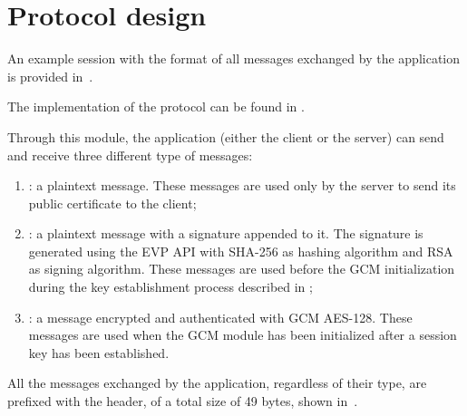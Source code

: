 \chapter{Protocol design}\label{ch:proto}

An example session with the format of all messages exchanged by the application
is provided in~.

The implementation of the protocol can be found in .

Through this module, the application (either the client or the server) can send
and receive three different type of messages:
\begin{enumerate}
	\item {}: a plaintext message. These messages are
		used only by the server to send its public certificate to the
		client;
	\item {}: a plaintext message with a signature
		appended to it. The signature is generated using the \openssl{}
		EVP API with SHA-256 as hashing algorithm and RSA as signing
		algorithm. These messages are used before the GCM initialization
		during the key establishment process described in
		;
	\item {}: a message encrypted and
		authenticated with GCM AES-128. These messages are used when the
		GCM module has been initialized after a session key has been
		established.
\end{enumerate}

All the messages exchanged by the application, regardless of their type, are
prefixed with the header, of a total size of 49 bytes, shown
in~.



